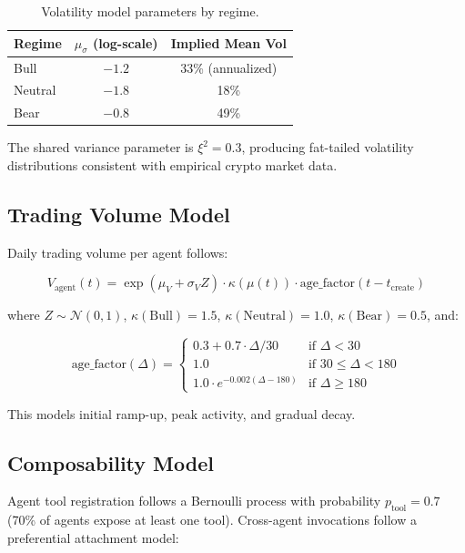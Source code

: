 \begin{table}[H]
\centering
\caption{Volatility model parameters by regime.}
\label{tab:sim-vol}
\begin{tabular}{@{}lcc@{}}
\toprule
\textbf{Regime} & $\mu_\sigma$ (log-scale) & \textbf{Implied Mean Vol} \\
\midrule
Bull & $-1.2$ & 33\% (annualized) \\
Neutral & $-1.8$ & 18\% \\
Bear & $-0.8$ & 49\% \\
\bottomrule
\end{tabular}
\end{table}

The shared variance parameter is $\xi^2 = 0.3$, producing fat-tailed
volatility distributions consistent with empirical crypto market data.

\subsection{Trading Volume Model}
\label{subsec:sim-volume}

Daily trading volume per agent follows:

\begin{equation}
  V_{\text{agent}}(t) = \exp(\mu_V + \sigma_V Z) \cdot \kappa(\mu(t)) \cdot \text{age\_factor}(t - t_{\text{create}})
\end{equation}

where $Z \sim \mathcal{N}(0,1)$, $\kappa(\text{Bull}) = 1.5$,
$\kappa(\text{Neutral}) = 1.0$, $\kappa(\text{Bear}) = 0.5$, and:

\begin{equation}
  \text{age\_factor}(\Delta) = \begin{cases}
    0.3 + 0.7 \cdot \Delta / 30 & \text{if } \Delta < 30 \\
    1.0 & \text{if } 30 \leq \Delta < 180 \\
    1.0 \cdot e^{-0.002(\Delta - 180)} & \text{if } \Delta \geq 180
  \end{cases}
\end{equation}

This models initial ramp-up, peak activity, and gradual decay.

\subsection{Composability Model}
\label{subsec:sim-comp}

Agent tool registration follows a Bernoulli process with probability
$p_{\text{tool}} = 0.7$ (70\% of agents expose at least one tool). Cross-agent
invocations follow a preferential attachment model:

